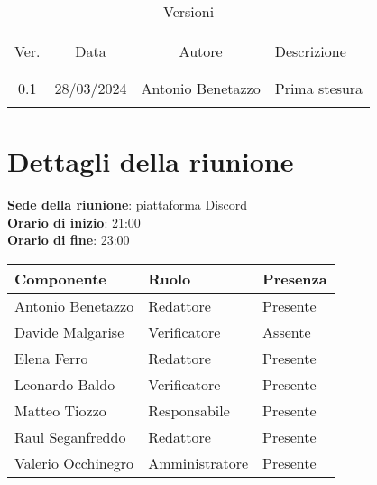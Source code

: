 \documentclass[italian,12pt]{article} %
\begin{document}


\newpage



\begin{table}[!h]
	\caption{Versioni}
	\begin{center}
		\begin{tabular}{ c c c p{9cm} }
			\hline                                                                                 \\[-2ex]
			Ver. & Data       & Autore             & Descrizione                                   \\
			\\[-2ex] \hline \\[-1.5ex]
			0.1  & 28/03/2024 & Antonio Benetazzo & Prima stesura                                  \\
			\\[-1.5ex] \hline
		\end{tabular}
	\end{center}
\end{table}

\newpage

\tableofcontents

\newpage

\section{Dettagli della riunione}


\textbf{Sede della riunione}: piattaforma Discord\\
\textbf{Orario di inizio}: 21:00\\
\textbf{Orario di fine}: 23:00\\


\begin{flushleft}
	\begin{table}[!h]
	\begin{tabular}{ |l|l|l| } 
		\hline
		\textbf{Componente} & \textbf{Ruolo} & \textbf{Presenza} \\
		\hline 
		Antonio Benetazzo 	& Redattore           & Presente \\
		Davide Malgarise 	& Verificatore        & Assente  \\
		Elena Ferro 		& Redattore           & Presente \\
		Leonardo Baldo 		& Verificatore        & Presente \\ 
		Matteo Tiozzo 		& Responsabile        & Presente \\ 
		Raul Seganfreddo 	& Redattore           & Presente \\
		Valerio Occhinegro 	& Amministratore      & Presente \\
		\hline
	\end{tabular}
	\end{table}
\end{flushleft}
\end{document}
